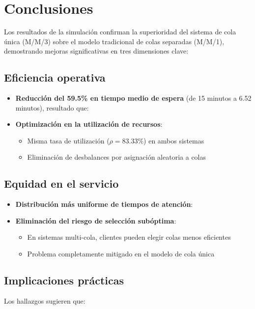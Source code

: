 \documentclass{article}
\begin{document}
\section{Conclusiones}\label{sec:conclusiones}

Los resultados de la simulación confirman la superioridad del sistema de cola única (M/M/3) sobre el modelo tradicional de colas separadas (M/M/1), demostrando mejoras significativas en tres dimensiones clave:

\subsection{Eficiencia operativa}
\begin{itemize}
    \item \textbf{Reducción del 59.5\% en tiempo medio de espera} (de 15 minutos a 6.52 minutos), resultado que:
    \item \textbf{Optimización en la utilización de recursos}:
        \begin{itemize}
            \item Misma tasa de utilización ($\rho = 83.33\%$) en ambos sistemas
            \item Eliminación de desbalances por asignación aleatoria a colas
        \end{itemize}
\end{itemize}

\subsection{Equidad en el servicio}
\begin{itemize}
    \item \textbf{Distribución más uniforme de tiempos de atención}:
    \item \textbf{Eliminación del riesgo de selección subóptima}:
        \begin{itemize}
            \item En sistemas multi-cola, clientes pueden elegir colas menos eficientes
            \item Problema completamente mitigado en el modelo de cola única
        \end{itemize}
\end{itemize}

\subsection{Implicaciones prácticas}
Los hallazgos sugieren que:
\end{document}
